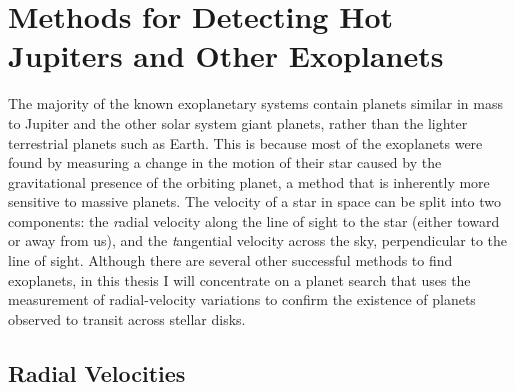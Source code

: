 \section{Methods for Detecting Hot Jupiters and Other Exoplanets}\label{cha:intro:sec:methods}

The majority of the known exoplanetary systems contain planets similar in mass to Jupiter and the other solar system giant planets, rather than the lighter terrestrial planets such as Earth.
This is because most of the exoplanets were found by measuring a change in the motion of their star caused by the gravitational presence of the orbiting planet, a method that is inherently more sensitive to massive planets.
The velocity of a star in space can be split into two components: the {\textit radial velocity} along the line of sight to the star (either toward or away from us), and the {\textit tangential velocity} across the sky, perpendicular to the line of sight.
Although there are several other successful methods to find exoplanets, in this thesis I will concentrate on a planet search that uses the measurement of radial-velocity variations to confirm the existence of planets observed to transit across stellar disks.

\subsection{Radial Velocities}\label{cha:intro:sec:methods:sub:rv}

